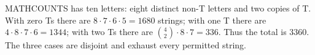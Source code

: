 MATHCOUNTS has ten letters: eight distinct non-T letters and two copies of T. With zero Ts there are $8\cdot7\cdot6\cdot5=1680$ strings; with one T there are $4\cdot8\cdot7\cdot6=1344$; with two Ts there are $\binom42\cdot8\cdot7=336$. Thus the total is $\boxed{3360}$. The three cases are disjoint and exhaust every permitted string.

